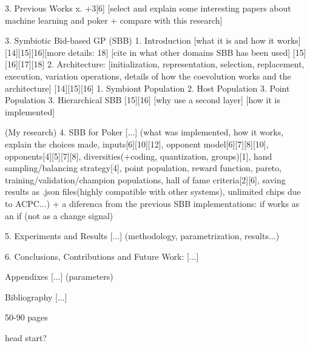     3. Previous Works
        x. +3[6] [select and explain some interesting papers about machine learning and poker + compare with this research]

3. Symbiotic Bid-based GP (SBB)
    1. Introduction
        [what it is and how it works] [14][15][16][more details: 18]
        [cite in what other domains SBB has been used] [15][16][17][18]
    2. Architecture: [initialization, representation, selection, replacement, execution, variation operations, details of how the coevolution works and the architecture] [14][15][16]
        1. Symbiont Population
        2. Host Population
        3. Point Population        
    3. Hierarchical SBB [15][16]
        [why use a second layer]
        [how it is implemented]

(My research)
4. SBB for Poker
[...] (what was implemented, how it works, explain the choices made, inputs[6][10][12], opponent model[6][7][8][10], opponents[4][5][7][8], diversities(+coding, quantization, groups)[1], hand sampling/balancing strategy[4], point population, reward function, pareto, training/validation/champion populations, hall of fame criteria[2][6], saving results as .json files(highly compatible with other systems), unlimited chips due to ACPC...)
+ a diferenca from the previous SBB implementations: if works as an if (not as a change signal)

5. Experiments and Results
[...] (methodology, parametrization, results...)

6. Conclusions, Contributions and Future Work:
[...]

Appendixes
[...] (parameters)

Bibliography
[...]


50-90 pages

head start?


